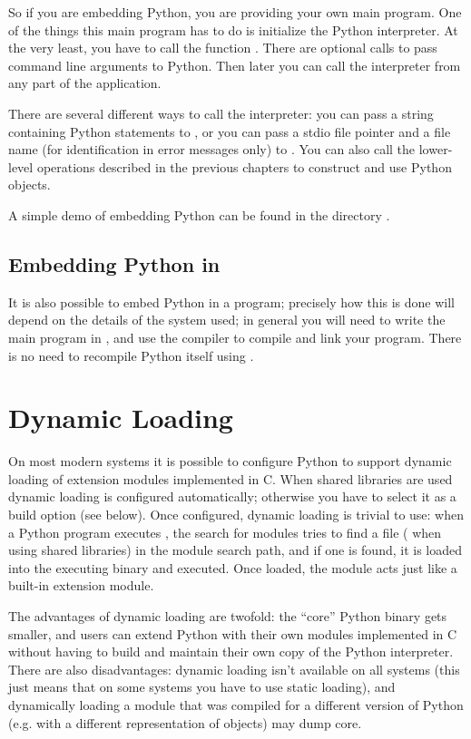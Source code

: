 So if you are embedding Python, you are providing your own main
program.  One of the things this main program has to do is initialize
the Python interpreter.  At the very least, you have to call the
function .  There are optional calls to pass command
line arguments to Python.  Then later you can call the interpreter
from any part of the application.

There are several different ways to call the interpreter: you can pass
a string containing Python statements to ,
or you can pass a stdio file pointer and a file name (for
identification in error messages only) to .  You
can also call the lower-level operations described in the previous
chapters to construct and use Python objects.

A simple demo of embedding Python can be found in the directory
.


\section{Embedding Python in \Cpp{}}

It is also possible to embed Python in a \Cpp{} program; precisely how this
is done will depend on the details of the \Cpp{} system used; in general you
will need to write the main program in \Cpp{}, and use the \Cpp{} compiler
to compile and link your program.  There is no need to recompile Python
itself using \Cpp{}.


\chapter{Dynamic Loading}

On most modern systems it is possible to configure Python to support
dynamic loading of extension modules implemented in C.  When shared
libraries are used dynamic loading is configured automatically;
otherwise you have to select it as a build option (see below).  Once
configured, dynamic loading is trivial to use: when a Python program
executes , the search for modules tries to find a
file  ( when using shared
libraries) in the module search path, and if one is found, it is
loaded into the executing binary and executed.  Once loaded, the
module acts just like a built-in extension module.

The advantages of dynamic loading are twofold: the ``core'' Python
binary gets smaller, and users can extend Python with their own
modules implemented in C without having to build and maintain their
own copy of the Python interpreter.  There are also disadvantages:
dynamic loading isn't available on all systems (this just means that
on some systems you have to use static loading), and dynamically
loading a module that was compiled for a different version of Python
(e.g. with a different representation of objects) may dump core.


